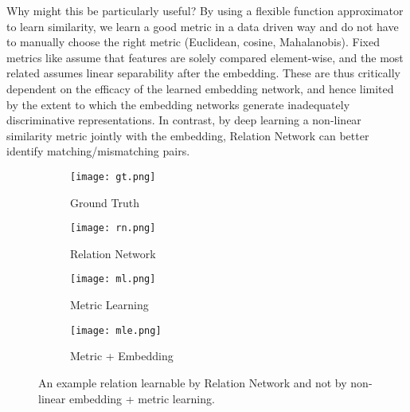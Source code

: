 \documentclass[10pt,twocolumn,letterpaper]{article}
\begin{document}
Why might this be particularly useful? By using a flexible function approximator to learn similarity, we learn a good metric in a data driven way and do not have to manually choose the right metric (Euclidean, cosine, Mahalanobis). Fixed metrics like \cite{vinyals2016matching, snell2017prototypical} assume that features are solely compared element-wise, and the most related \cite{snell2017prototypical} assumes linear separability after the embedding. These are thus critically dependent on the efficacy of the learned embedding network, and hence limited by the extent to which the embedding networks generate inadequately discriminative representations. 
In contrast, by deep learning a  non-linear similarity metric jointly with the embedding, Relation Network can better identify matching/mismatching pairs. 

\begin{figure}[t] 
	\begin{subfigure}[b]{0.5\linewidth}
		\centering
		\texttt{[image: gt.png]} 
		\caption{Ground Truth} 
		\label{fig8:a} 
	\end{subfigure}\begin{subfigure}[b]{0.5\linewidth}
		\centering
		\texttt{[image: rn.png]} 
		\caption{Relation Network} 
		\label{fig8:b} 
	\end{subfigure} 
	\begin{subfigure}[b]{0.5\linewidth}
		\centering
		\texttt{[image: ml.png]} 
		\caption{Metric Learning} 
		\label{fig8:c} 
	\end{subfigure}\begin{subfigure}[b]{0.5\linewidth}
		\centering
		\texttt{[image: mle.png]} 
		\caption{Metric + Embedding} 
		\label{fig8:d} 
	\end{subfigure} 
	\caption{\small An example relation learnable by Relation Network and not by non-linear embedding + metric learning.}
	\label{fig8} 
\end{figure}
\end{document}
